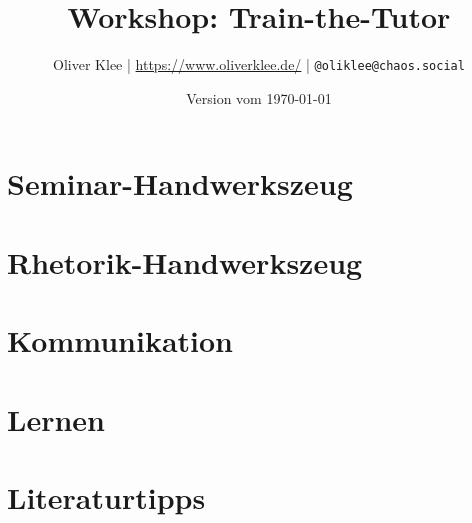\documentclass[a4paper,openany,twoside,titlepage,10pt,headsepline]{scrbook}
\author{Oliver Klee | \url{https://www.oliverklee.de/} | \texttt{@oliklee@chaos.social}}
\title{Workshop: Train-the-Tutor}
\date{Version vom \today}
\begin{document}
\frontmatter

\maketitle

\tableofcontents

\mainmatter

\chapter{Seminar-Handwerkszeug}










\chapter{Rhetorik-Handwerkszeug}




\chapter{Kommunikation}






\chapter{Lernen}















\backmatter

\chapter{Literaturtipps}
\end{document}

